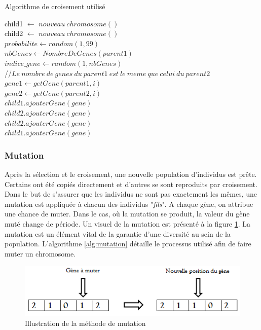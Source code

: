 \documentclass[12pt,a4paper]{article}
\begin{document}
		\begin{algorithm}[H]
 		\caption{Algorithme de croisement utilisé}
 		\label{alg:cross_over}
 		\BlankLine
 		child1 $\gets$ $nouveau\ chromosome()$ \\
 		child2 $\gets$ $nouveau\ chromosome()$ \\
 		$probabilite \gets random(1,99)$ \\
 		\BlankLine
 		{
 			$nbGenes \gets NombreDeGenes(parent1)$\\
 			$indice\_gene \gets random(1, nbGenes)$\\
 			//$ Le \ nombre \ de \ genes \ du \ parent1 \ est \ le \ meme \ que \ celui \ du \ parent2 $\\
 			{
 				$gene1 \gets getGene(parent1, i)$ \\
 				$gene2 \gets getGene(parent2, i)$ \\
 				{
 					$child1.ajouterGene(gene)$ \\
 					$child2.ajouterGene(gene)$ \\
 				}
 				{
 					$child2.ajouterGene(gene)$ \\
 					$child1.ajouterGene(gene)$ \\
 				}
 			}
 		}
		\end{algorithm}
		  
	\subsubsection{Mutation}
	Après la sélection et le croisement, une nouvelle population d'individus est prête. Certains ont été copiés directement et d'autres se sont reproduits par croisement. Dans le but de s'assurer que les individus ne sont pas exactement les mêmes, une mutation est appliquée à chacun des individus "\emph{fils}". A chaque gène, on attribue une chance de muter. Dans le cas, où la mutation se produit, la valeur du gène muté change de période. Un visuel de la mutation est présenté à la figure \ref{fig:used_mutation}. La mutation est un élément vital de la garantie d'une diversité au sein de la population. L'algorithme \ref{alg:mutation} détaille le processus utilisé afin de faire muter un chromosome. 
	
	\begin{figure}[!h]
		\begin{center}
			\includegraphics[scale=.5]{img/mutation_fig.png}
			\caption{Illustration de la méthode de mutation}
			\label{fig:used_mutation}
		\end{center}
	\end{figure}
	
\end{document}

